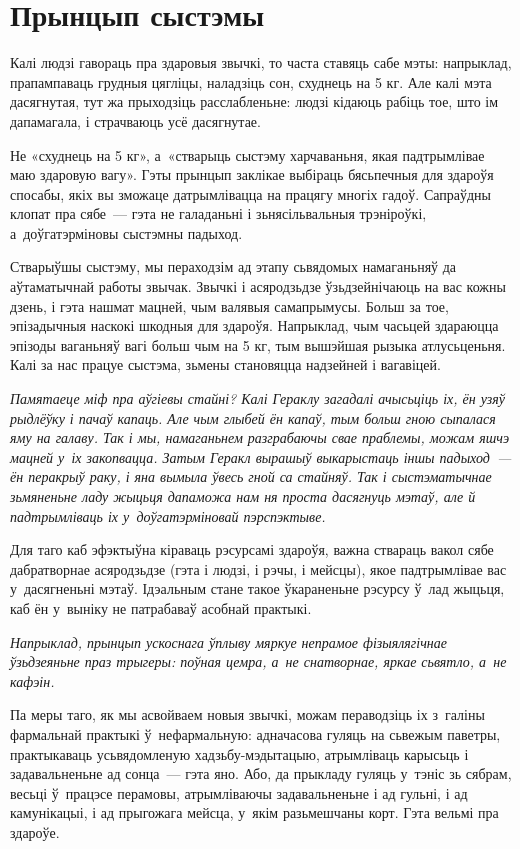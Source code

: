 \section{Прынцып сыстэмы}

Калі людзі гавораць пра здаровыя звычкі, то часта ставяць сабе мэты: напрыклад, прапампаваць грудныя цягліцы, наладзіць сон, схуднець на 5 кг. Але калі мэта дасягнутая, тут жа прыходзіць расслабленьне: людзі кідаюць рабіць тое, што ім дапамагала, і страчваюць усё дасягнутае.


Не «схуднець на 5 кг», а~«стварыць сыстэму харчаваньня, якая падтрымлівае маю здаровую вагу». Гэты прынцып заклікае выбіраць бясьпечныя для здароўя спосабы, якіх вы зможаце датрымлівацца на працягу многіх гадоў. Сапраўдны клопат пра сябе~--- гэта не галаданьні і зьнясільвальныя трэніроўкі, а~доўгатэрміновы сыстэмны падыход.

Стварыўшы сыстэму, мы пераходзім ад этапу сьвядомых намаганьняў да аўтаматычнай работы звычак. Звычкі і асяродзьдзе ўзьдзейнічаюць на вас кожны дзень, і гэта нашмат мацней, чым валявыя самапрымусы. Больш за тое, эпізадычныя наскокі шкодныя для здароўя. Напрыклад, чым часьцей здараюцца эпізоды ваганьняў вагі больш чым на 5 кг, тым вышэйшая рызыка атлусьценьня. Калі за нас працуе сыстэма, зьмены становяцца надзейней і вагавіцей.

\emph{Памятаеце міф пра аўгіевы стайні? Калі Гераклу загадалі ачысьціць іх, ён узяў рыдлёўку і пачаў капаць. Але чым глыбей ён капаў, тым больш гною сыпалася яму на галаву. Так і мы, намаганьнем разграбаючы свае праблемы, можам яшчэ мацней у~іх закопвацца. Затым Геракл вырашыў выкарыстаць іншы падыход~--- ён перакрыў раку, і яна вымыла ўвесь гной са стайняў. Так і сыстэматычнае зьмяненьне ладу жыцьця дапаможа нам ня проста дасягнуць мэтаў, але й падтрымліваць іх у~доўгатэрміновай пэрспэктыве.}

Для таго каб эфэктыўна кіраваць рэсурсамі здароўя, важна ствараць вакол сябе дабратворнае асяродзьдзе (гэта і людзі, і рэчы, і мейсцы), якое падтрымлівае вас у~дасягненьні мэтаў. Ідэальным стане такое ўкараненьне рэсурсу ў~лад жыцьця, каб ён у~выніку не патрабаваў асобнай практыкі.

\emph{Напрыклад, прынцып ускоснага ўплыву мяркуе непрамое фізыялягічнае ўзьдзеяньне праз трыгеры: поўная цемра, а~не снатворнае, яркае сьвятло, а~не кафэін.}

Па меры таго, як мы асвойваем новыя звычкі, можам пераводзіць іх з~галіны фармальнай практыкі ў~нефармальную: адначасова гуляць на сьвежым паветры, практыкаваць усьвядомленую хадзьбу-мэдытацыю, атрымліваць карысьць і задавальненьне ад сонца~--- гэта яно. Або, да прыкладу гуляць у~тэніс зь сябрам, весьці ў~працэсе перамовы, атрымліваючы задавальненьне і ад гульні, і ад камунікацыі, і ад прыгожага мейсца, у~якім разьмешчаны корт. Гэта вельмі пра здароўе.

